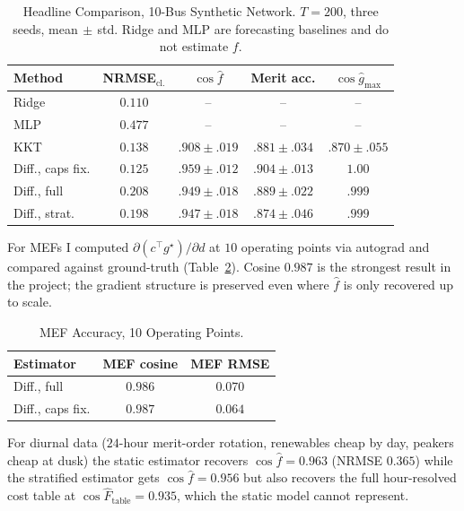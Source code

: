 \documentclass[10pt,letterpaper]{article}
\newcommand{\opt}{^{\star}}
\begin{document}
\begin{table}[h]
\centering
\caption{Headline Comparison, 10-Bus Synthetic Network.
  $T=200$, three seeds, mean$\,\pm\,$std.
  Ridge and MLP are forecasting baselines and do not estimate $f$.}
\label{tab:methods}
\setlength{\tabcolsep}{4pt}
\renewcommand{\arraystretch}{1.05}
\small
\begin{tabular}{@{}lcccc@{}}
\toprule
Method & NRMSE$_\text{cl.}$ & $\cos\hat f$ & Merit acc. & $\cos\hat g_{\max}$ \\
\midrule
Ridge              & $0.110$ & {--}            & {--}            & {--}            \\
MLP                & $0.477$ & {--}            & {--}            & {--}            \\
KKT                & $0.138$ & $.908{\pm}.019$ & $.881{\pm}.034$ & $.870{\pm}.055$ \\
Diff., caps fix.   & $\mathbf{0.125}$ & $\mathbf{.959{\pm}.012}$ & $\mathbf{.904{\pm}.013}$ & $\mathbf{1.00}$ \\
Diff., full        & $0.208$ & $.949{\pm}.018$ & $.889{\pm}.022$ & $.999$          \\
Diff., strat.      & $0.198$ & $.947{\pm}.018$ & $.874{\pm}.046$ & $.999$          \\
\bottomrule
\end{tabular}
\end{table}

For MEFs I computed $\partial(c^\top g\opt)/\partial d$ at $10$
operating points via autograd and compared against ground-truth
(Table~\ref{tab:mef}). Cosine $0.987$ is the strongest result in
the project; the gradient structure is preserved even where $\hat f$
is only recovered up to scale.

\begin{table}[h]
\centering
\caption{MEF Accuracy, 10 Operating Points.}
\label{tab:mef}
\setlength{\tabcolsep}{6pt}
\renewcommand{\arraystretch}{1.05}
\small
\begin{tabular}{@{}lcc@{}}
\toprule
Estimator & MEF cosine & MEF RMSE \\
\midrule
Diff., full      & $0.986$ & $0.070$ \\
Diff., caps fix. & $0.987$ & $0.064$ \\
\bottomrule
\end{tabular}
\end{table}

For diurnal data ($24$-hour merit-order rotation, renewables cheap
by day, peakers cheap at dusk) the static estimator recovers
$\cos\hat f = 0.963$ (NRMSE $0.365$) while the stratified estimator
gets $\cos\hat f = 0.956$ but also recovers the full hour-resolved
cost table at $\cos\hat F_\text{table} = 0.935$, which the static
model cannot represent.
\end{document}
